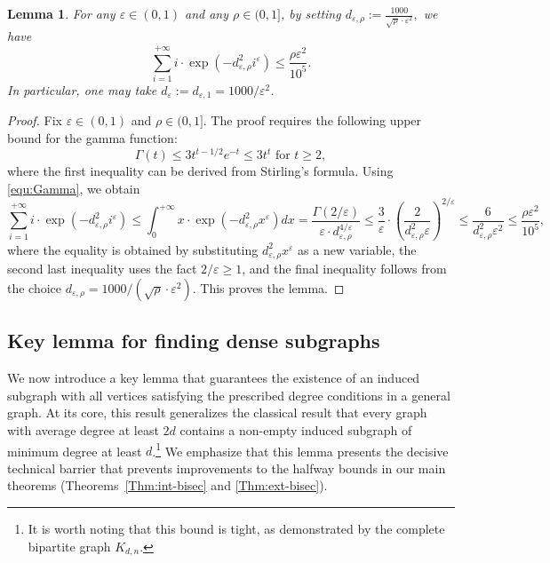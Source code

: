 \documentclass{aic}
\newtheorem{lemma}[dfn]{Lemma}
\begin{document}
	
	\begin{lemma}\label{Lem:exist C}
		For any $\varepsilon\in (0,1)$ and any $\rho\in (0,1]$, by setting
		$d_{\varepsilon,\rho}:=\frac{1000}{\sqrt{\rho}\cdot \varepsilon^2},$
		we have
		$$\sum_{i=1}^{+\infty} i\cdot \exp(-d_{\varepsilon,\rho}^2i^{\varepsilon})\leq \frac{\rho\varepsilon^2}{10^5}.$$
		In particular, one may take $d_\varepsilon:=d_{\varepsilon,1}=1000/\varepsilon^2$.
	\end{lemma}
	
	\begin{proof}
		Fix $\varepsilon\in (0,1)$ and $\rho\in (0,1]$.
		The proof requires the following upper bound for the gamma function:
		\begin{equation}\label{equ:Gamma}
			\Gamma(t)\leq 3t^{t-1/2} e^{-t}\leq 3 t^t \mbox{ for } t\geq 2,
		\end{equation}
		where the first inequality can be derived from Stirling's formula.
		Using \eqref{equ:Gamma}, we obtain
		$$\sum_{i=1}^{+\infty} i\cdot \exp(-d_{\varepsilon,\rho}^2i^{\varepsilon})\leq \int_{0}^{+\infty} x\cdot \exp(-d_{\varepsilon,\rho}^2 x^{\varepsilon})dx=
		\frac{\Gamma(2/\varepsilon)}{\varepsilon\cdot d_{\varepsilon,\rho}^{4/\varepsilon}}\leq \frac{3}{\varepsilon}\cdot \left(\frac{2}{d_{\varepsilon,\rho}^2\varepsilon}\right)^{2/\varepsilon}
		\leq \frac{6}{d_{\varepsilon,\rho}^2\varepsilon^2}\leq \frac{\rho\varepsilon^2}{10^5},$$
		where the equality is obtained by substituting $d_{\varepsilon,\rho}^2 x^{\varepsilon}$ as a new variable,
		the second last inequality uses the fact $2/\varepsilon\geq 1$,
		and the final inequality follows from the choice $d_{\varepsilon,\rho}=1000/(\sqrt{\rho}\cdot \varepsilon^2)$.
		This proves the lemma.
	\end{proof}
	
	
	\subsection{Key lemma for finding dense subgraphs}
	\noindent We now introduce a key lemma that guarantees the existence of an induced subgraph with all vertices satisfying the prescribed degree conditions in a general graph.
	At its core, this result generalizes the classical result that every graph with average degree at least $2d$ contains a non-empty induced subgraph of minimum degree at least $d$.\footnote{It is worth noting that this bound is tight, as demonstrated by the complete bipartite graph $K_{d,n}$.}
	We emphasize that this lemma presents the decisive technical barrier that prevents improvements to the halfway bounds
	in our main theorems (Theorems~\ref{Thm:int-bisec} and \ref{Thm:ext-bisec}).
	
\end{document}
